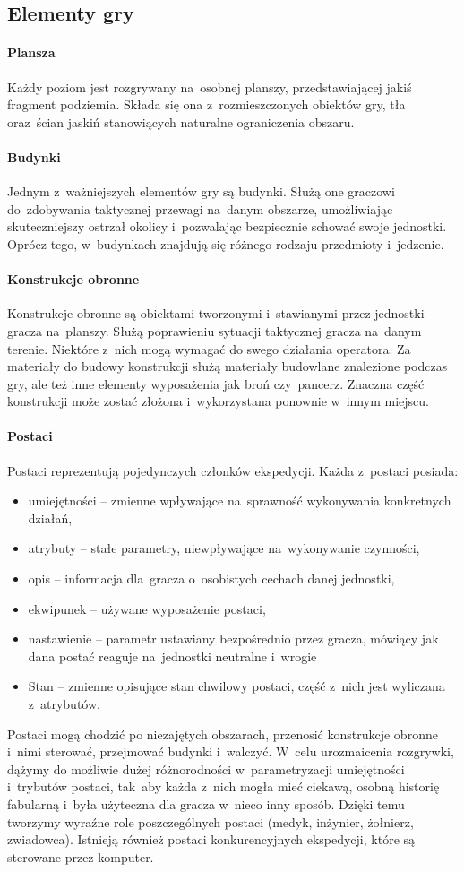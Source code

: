 \documentclass[licencjacka]{pracamgr}
\begin{document}
    \subsection{Elementy gry}
      \paragraph{Plansza}
	Każdy poziom jest rozgrywany na~osobnej planszy, przedstawiającej jakiś fragment podziemia. Składa się ona z~rozmieszczonych
	obiektów gry, tła oraz~ścian jaskiń stanowiących naturalne ograniczenia obszaru.
      \paragraph{Budynki}
	Jednym z~ważniejszych elementów gry są budynki. Służą one graczowi do~zdobywania taktycznej przewagi na~danym
	obszarze, umożliwiając skuteczniejszy ostrzał okolicy i~pozwalając bezpiecznie schować swoje jednostki. Oprócz tego,
	w~budynkach znajdują się różnego rodzaju przedmioty i~jedzenie.
      \paragraph{Konstrukcje obronne}
	Konstrukcje obronne są obiektami tworzonymi i~stawianymi przez jednostki gracza na~planszy. Służą poprawieniu sytuacji
	taktycznej gracza na~danym terenie. Niektóre z~nich mogą wymagać do swego działania operatora. Za materiały do budowy konstrukcji
	służą materiały budowlane znalezione podczas gry, ale też inne elementy wyposażenia jak broń czy~pancerz. Znaczna część konstrukcji może zostać
	złożona i~wykorzystana ponownie w~innym miejscu.
      \paragraph{Postaci}
	Postaci reprezentują pojedynczych członków ekspedycji. Każda z~postaci posiada:
	\begin{itemize}
	 \item umiejętności -- zmienne wpływające na~sprawność wykonywania konkretnych działań,
	 \item atrybuty -- stałe parametry, niewpływające na~wykonywanie czynności,
	 \item opis -- informacja dla~gracza o~osobistych cechach danej jednostki,
	 \item ekwipunek -- używane wyposażenie postaci,
	 \item nastawienie -- parametr ustawiany bezpośrednio przez gracza, mówiący jak dana postać reaguje na~jednostki neutralne i~wrogie
	 \item Stan -- zmienne opisujące stan chwilowy postaci, część z~nich jest wyliczana z~atrybutów.
	\end{itemize}
	Postaci mogą chodzić po niezajętych obszarach, przenosić konstrukcje obronne i~nimi sterować,
	przejmować budynki i~walczyć. W~celu urozmaicenia rozgrywki, dążymy do możliwie dużej różnorodności w~parametryzacji
	umiejętności i~trybutów postaci, tak~aby każda z~nich mogła mieć ciekawą, osobną historię fabularną i~była użyteczna
	dla gracza w~nieco inny sposób. Dzięki temu tworzymy wyraźne role poszczególnych postaci (medyk, inżynier, żołnierz, zwiadowca).
	Istnieją również postaci konkurencyjnych ekspedycji, które są sterowane przez komputer.
\end{document}
